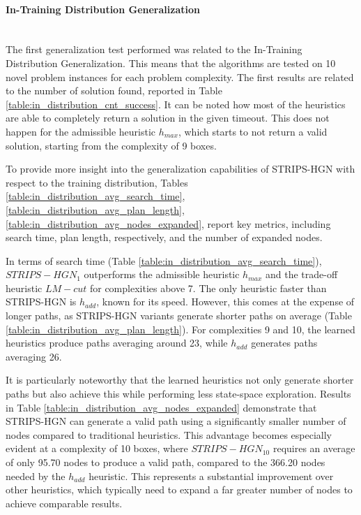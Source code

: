 \paragraph*{In-Training Distribution Generalization}\mbox{}\\
The first generalization test performed was related to the In-Training Distribution Generalization. This means that the algorithms are tested on 10 novel problem instances for each problem complexity.
The first results are related to the number of solution found, reported in Table \ref{table:in_distribution_cnt_success}. It can be noted how most of the heuristics are able to completely return a solution in the given timeout. This does not happen for the admissible heuristic $h_{max}$, which starts to not return a valid solution, starting from the complexity of 9 boxes. 



To provide more insight into the generalization capabilities of STRIPS-HGN with respect to the training distribution, Tables \ref{table:in_distribution_avg_search_time}, \ref{table:in_distribution_avg_plan_length}, \ref{table:in_distribution_avg_nodes_expanded}, report key metrics, including search time, plan length, respectively, and the number of expanded nodes.



In terms of search time (Table \ref{table:in_distribution_avg_search_time}), $STRIPS-HGN_1$ outperforms the admissible heuristic $h_{max}$ and the trade-off heuristic $LM-cut$ for complexities above 7. The only heuristic faster than STRIPS-HGN is $h_{add}$, known for its speed. However, this comes at the expense of longer paths, as STRIPS-HGN variants generate shorter paths on average (Table \ref{table:in_distribution_avg_plan_length}). For complexities 9 and 10, the learned heuristics produce paths averaging around 23, while $h_{add}$ generates paths averaging 26.

It is particularly noteworthy that the learned heuristics not only generate shorter paths but also achieve this while performing less state-space exploration. Results in Table \ref{table:in_distribution_avg_nodes_expanded} demonstrate that STRIPS-HGN can generate a valid path using a significantly smaller number of nodes compared to traditional heuristics. This advantage becomes especially evident at a complexity of 10 boxes, where $STRIPS-HGN_{10}$ requires an average of only 95.70 nodes to produce a valid path, compared to the 366.20 nodes needed by the $h_{add}$ heuristic. This represents a substantial improvement over other heuristics, which typically need to expand a far greater number of nodes to achieve comparable results. 

